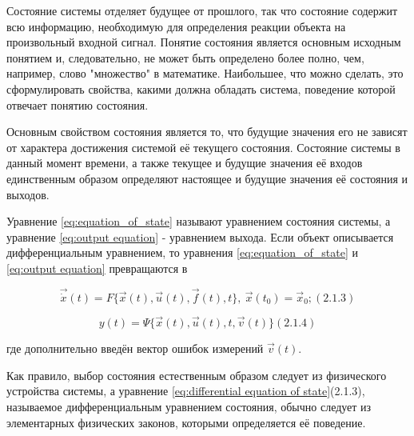 		Состояние системы отделяет будущее от прошлого, так что состо­яние содержит всю информацию, необходимую для определения
		реакции объекта на произвольный входной сигнал. Понятие состояния является основным исходным понятием и, следовательно,
		не может быть определено более полно, чем, например, слово "множество" в математике. Наибольшее, что можно сделать, это
		сформулировать свойства, какими должна обладать система, поведение которой отвечает понятию состо­яния.



		Основным свойством состояния является то, что будущие значения его не зависят от характера достижения системой её
		текущего состо­яния. Состояние системы в данный момент времени, а также текущее и будущие значения её входов
		единственным образом определяют настоя­щее и будущие значения её состояния и выходов.



		Уравнение \eqref{eq:equation_of_state} называют уравнением состояния системы, а уравне­ние \eqref{eq:output equation} - уравнением выхода. Если объект
		описывается дифференциаль­ным уравнением, то уравнения \eqref{eq:equation_of_state} и \eqref{eq:output equation} превращаются в



\begin{equation}\label{eq:differential equation of state}
		  \vec{\dot x}(t)=F\{\vec x(t),\vec u(t),\vec f(t),t\}, \  \vec x(t_0)=\vec x_0; (2.1.3)
\end{equation}

\begin{equation}
	y(t)=\Psi\{\vec x(t),\vec u(t),t,\vec v(t)\} (2.1.4)
\end{equation}
		 
		где дополнительно введён вектор ошибок измерений  $\vec v(t)$.



		Как правило, выбор состояния естественным образом следует из физического устройства системы, а уравнение \eqref{eq:differential equation of state}(2.1.3),
		называемое диффе­ренциальным уравнением состояния, обычно следует из элементарных физических законов, которыми
		определяется её поведение.


